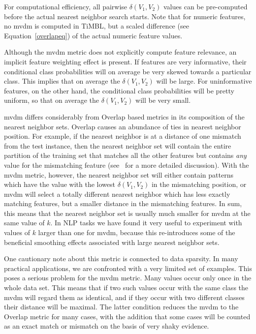 \documentclass{report}
\begin{document}
For computational efficiency, all pairwise $\delta(V_{1}, V_{2})$
values can be pre-comput\-ed before the actual nearest neighbor search
starts. Note that for numeric features, no {\sc mvdm} is computed in
TiMBL, but a scaled difference (see Equation~\ref{overlapeq}) of the
actual numeric feature values.

Although the {\sc mvdm} metric does not explicitly compute feature
relevance, an implicit feature weighting effect is present. If
features are very informative, their conditional class probabilities
will on average be very skewed towards a particular class. This
implies that on average the $\delta(V_{1}, V_{2})$ will be large. For
uninformative features, on the other hand, the conditional class
probabilities will be pretty uniform, so that on average the
$\delta(V_{1}, V_{2})$ will be very small.

{\sc mvdm} differs considerably from Overlap based metrics in its
composition of the nearest neighbor sets. Overlap causes an abundance
of ties in nearest neighbor position. For example, if the nearest
neighbor is at a distance of one mismatch from the test instance, then
the nearest neighbor set will contain the entire partition of the
training set that matches all the other features but contains {\em
any} value for the mismatching feature (see~\cite{Zavrel+97} for a
more detailed discussion). With the {\sc mvdm} metric, however, the
nearest neighbor set will either contain patterns which have the value
with the lowest $\delta(V_{1}, V_{2})$ in the mismatching position, or
{\sc mvdm} will select a totally different nearest neighbor which has
less exactly matching features, but a smaller distance in the
mismatching features. In sum, this
means that the nearest neighbor set is usually much smaller for {\sc
mvdm} at the same value of $k$. In NLP tasks we have found it very
useful to experiment with values of $k$ larger than one for {\sc
mvdm}, because this re-introduces some of the beneficial smoothing
effects associated with large nearest neighbor sets.

One cautionary note about this metric is connected to data
sparsity. In many practical applications, we are confronted with a
very limited set of examples. This poses a serious problem for the
{\sc mvdm} metric. Many values occur only once in the whole data
set. This means that if two such values occur with the same class the
{\sc mvdm} will regard them as identical, and if they occur with two
different classes their distance will be maximal. The latter condition
reduces the {\sc mvdm} to the Overlap metric for many cases, with the
addition that some cases will be counted as an exact match or mismatch
on the basis of very shaky evidence.
\end{document}
